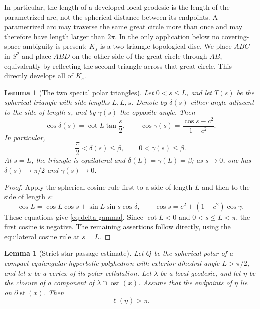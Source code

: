 \documentclass[12pt,a4paper]{article}
\newtheorem{lemma}[theorem]{Lemma}
\theoremstyle{definition}
\begin{document}
In particular, the length of a developed local geodesic is the length of the
parametrized arc, not the spherical distance between its endpoints.  A
parametrized arc may traverse the same great circle more than once and may
therefore have length larger than \(2\pi\).  In the only application below no
covering-space ambiguity is present: \(K_s\) is a two-triangle topological
disc.  We place \(ABC\) in \(S^2\) and place \(ABD\) on the other side of the
great circle through \(AB\), equivalently by reflecting the second triangle
across that great circle.  This directly develops all of \(K_s\).

\begin{lemma}[The two special polar triangles]\label{lem:special-polar-triangles}
Let \(0<s\le L\), and let \(T(s)\) be the spherical triangle with side
lengths \(L,L,s\).  Denote by \(\delta(s)\) either angle adjacent to the side
of length \(s\), and by \(\gamma(s)\) the opposite angle.  Then
\begin{equation}\label{eq:delta-gamma}
 \cos\delta(s)=\cot L\tan\frac{s}{2},
 \qquad
 \cos\gamma(s)=\frac{\cos s-c^2}{1-c^2}.
\end{equation}
In particular,
\begin{equation}\label{eq:delta-gamma-bounds}
        \frac\pi2<\delta(s)\le\beta,
        \qquad 0<\gamma(s)\le\beta .
\end{equation}
At \(s=L\), the triangle is equilateral and
\(\delta(L)=\gamma(L)=\beta\); as \(s\to0\), one has
\(\delta(s)\to\pi/2\) and \(\gamma(s)\to0\).
\end{lemma}

\begin{proof}
Apply the spherical cosine rule first to a side of length \(L\) and then to
the side of length \(s\):
\[
 \cos L=\cos L\cos s+\sin L\sin s\cos\delta,
 \qquad
 \cos s=c^2+(1-c^2)\cos\gamma .
\]
These equations give \eqref{eq:delta-gamma}.  Since \(\cot L<0\) and
\(0<s\le L<\pi\), the first cosine is negative.  The remaining assertions
follow directly, using the equilateral cosine rule at \(s=L\).
\end{proof}

\begin{lemma}[Strict star-passage estimate]
\label{lem:ordinary-star-passage}
Let \(Q\) be the spherical polar of a compact equiangular hyperbolic
polyhedron with exterior dihedral angle \(L>\pi/2\), and let \(x\) be a
vertex of its polar cellulation. Let \(\lambda\) be a local geodesic, and let
\(\eta\) be the closure of a component of
\(\lambda\cap\operatorname{ost}(x)\).  Assume that the endpoints of \(\eta\)
lie on \(\partial\operatorname{st}(x)\). Then
\[
        \ell(\eta)>\pi .
\]
\end{lemma}
\end{document}
